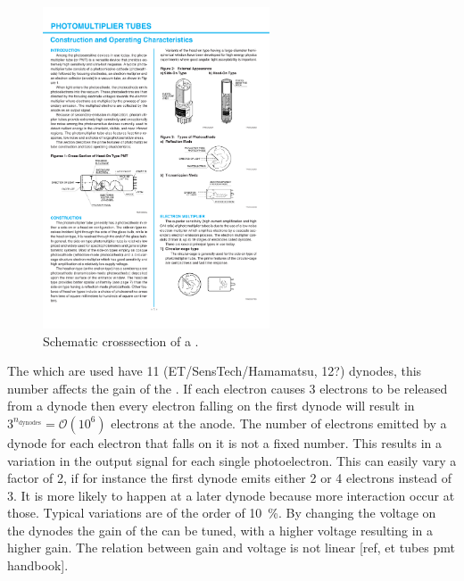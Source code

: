 \begin{figure}
    \centering
    \includegraphics[width=0.6\textwidth]
                    {plots/station/pmt_schematic}
    \caption{Schematic crosssection of a \pmt.}
    \label{fig:pmt_schematic}
\end{figure}

The \pmts which are used have 11 (ET/SensTech/Hamamatsu, 12?) dynodes, this number affects the gain of the \pmt. If each electron causes \num{3} electrons to be released from a dynode then every electron falling on the first dynode will result in $3^{n_{\mathrm{dynodes}}} = \mathcal{O}(10^6)$ electrons at the anode. The number of electrons emitted by a dynode for each electron that falls on it is not a fixed number. This results in a variation in the output signal for each single photoelectron. This can easily vary a factor of 2, if for instance the first dynode emits either 2 or 4 electrons instead of 3. It is more likely to happen at a later dynode because more interaction occur at those. Typical variations are of the order of \SI{10}{\percent}. By changing the voltage on the dynodes the gain of the \pmt can be tuned, with a higher voltage resulting in a higher gain. The relation between gain and voltage is not linear [ref, et tubes pmt handbook].

